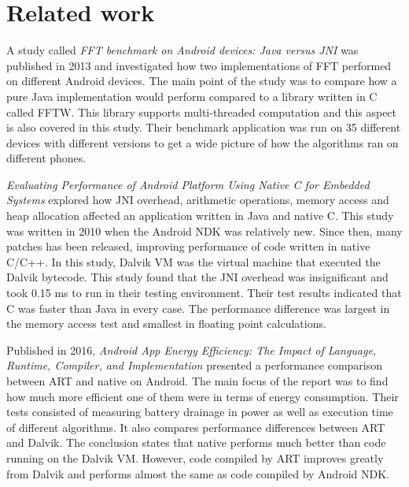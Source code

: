 \section{Related work}
A study called \emph{FFT benchmark on Android devices: Java versus JNI} \cite{Jr2013} was published in 2013 and investigated how two implementations of FFT performed on different Android devices. The main point of the study was to compare how a pure Java implementation would perform compared to a library written in C called FFTW. This library supports multi-threaded computation and this aspect is also covered in this study. Their benchmark application was run on 35 different devices with different versions to get a wide picture of how the algorithms ran on different phones.

\emph{Evaluating Performance of Android Platform Using Native C for Embedded Systems} \cite{Lee2010} explored how JNI overhead, arithmetic operations, memory access and heap allocation affected an application written in Java and native C. This study was written in 2010 when the Android NDK was relatively new. Since then, many patches has been released, improving performance of code written in native C/C++. In this study, Dalvik VM was the virtual machine that executed the Dalvik bytecode. This study found that the JNI overhead was insignificant and took 0.15 ms to run in their testing environment. Their test results indicated that C was faster than Java in every case. The performance difference was largest in the memory access test and smallest in floating point calculations.

Published in 2016, \emph{Android App Energy Efficiency: The Impact of Language, Runtime, Compiler, and Implementation} \cite{Chen2016} presented a performance comparison between ART and native on Android. The main focus of the report was to find how much more efficient one of them were in terms of energy consumption. Their tests consisted of measuring battery drainage in power as well as execution time of different algorithms. It also compares performance differences between ART and Dalvik. The conclusion states that native performs much better than code running on the Dalvik VM. However, code compiled by ART improves greatly from Dalvik and performs almost the same as code compiled by Android NDK.
